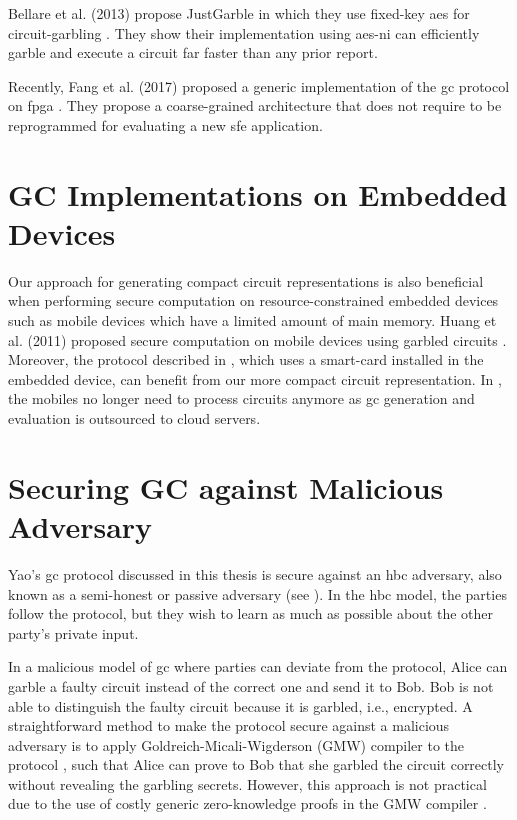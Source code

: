 Bellare et al. (2013) propose JustGarble in which they use fixed-key \acrshort{aes} for circuit-garbling \cite{bellare2013efficient}.
They show their implementation using \acrshort{aes-ni} can efficiently garble and execute a circuit far faster than any prior report.

Recently, Fang et al. (2017) proposed a generic implementation of the \acrshort{gc} protocol on \acrshort{fpga} \cite{fang2017secure}.
They propose a coarse-grained architecture that does not require to be reprogrammed for evaluating a new \acrshort{sfe} application.

\section{GC Implementations on Embedded Devices} \label{sec:related-embedded}
Our approach for generating compact circuit representations is also beneficial when performing secure computation on resource-constrained embedded devices such as mobile devices which have a limited amount of main memory.
Huang et al. (2011) proposed secure computation on mobile devices using garbled circuits \cite{huang2011privacy}.
Moreover, the protocol described in \cite{demmler2014ad}, which uses a smart-card installed in the embedded device, can benefit from our more compact circuit representation.
In \cite{carter2016secure, carter2014whitewash}, the mobiles no longer need to process circuits anymore as \acrshort{gc} generation and evaluation is outsourced to cloud servers.

\section{Securing GC against Malicious Adversary}\label{sec:related-malicious}
Yao's \acrshort{gc} protocol discussed in this thesis is secure against an \acrfull{hbc} adversary, also known as a semi-honest or passive adversary (see ).
In the \acrshort{hbc} model, the parties follow the protocol, but they wish to learn as much as possible about the other party's private input.


In a malicious model of \acrshort{gc} where parties can deviate from the protocol, Alice can garble a faulty circuit instead of the correct one and send it to Bob.
Bob is not able to distinguish the faulty circuit because it is garbled, i.e., encrypted.
A straightforward method to make the protocol secure against a malicious adversary is to apply Goldreich-Micali-Wigderson (GMW) compiler to the protocol \cite{goldreich1987play}, such that Alice can prove to Bob that she garbled the circuit correctly without revealing the garbling secrets.
However, this approach is not practical due to the use of costly generic zero-knowledge proofs in the GMW compiler \cite{lindell2007efficient}.

